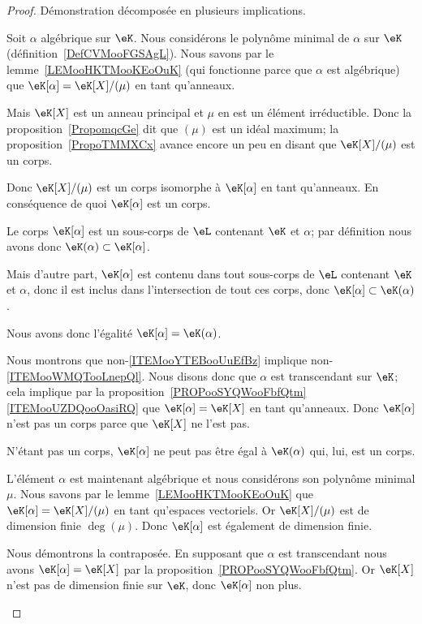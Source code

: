 \begin{proof}
	Démonstration décomposée en plusieurs implications.
	\begin{subproof}

		Soit \( \alpha\) algébrique sur \( \eK\). Nous considérons le polynôme minimal de \( \alpha\) sur \( \eK\) (définition~\ref{DefCVMooFGSAgL}). Nous savons par le lemme~\ref{LEMooHKTMooKEoOuK} (qui fonctionne parce que \( \alpha\) est algébrique) que \( \eK[\alpha]=\eK[X]/(\mu)\) en tant qu'anneaux.

		Mais \( \eK[X]\) est un anneau principal et \( \mu\) en est un élément irréductible. Donc la proposition~\ref{PropomqcGe} dit que \( (\mu)\) est un idéal maximum; la proposition~\ref{PropoTMMXCx} avance encore un peu en disant que \( \eK[X]/(\mu)\) est un corps.

		Donc \( \eK[X]/(\mu)\) est un corps isomorphe à \( \eK[\alpha]\) en tant qu'anneaux. En conséquence de quoi \( \eK[\alpha]\) est un corps.

		Le corps \( \eK[\alpha]\) est un sous-corps de \( \eL\) contenant \( \eK\) et \( \alpha\); par définition nous avons donc \( \eK(\alpha)\subset \eK[\alpha]\).

		Mais d'autre part, \( \eK[\alpha]\) est contenu dans tout sous-corps de \( \eL\) contenant \( \eK\) et \( \alpha\), donc il est inclus dans l'intersection de tout ces corps, donc \( \eK[\alpha]\subset \eK(\alpha)\).

		Nous avons donc l'égalité \( \eK[\alpha]=\eK(\alpha)\).


		Nous montrons que non-\ref{ITEMooYTEBooUuEfBz} implique non-\ref{ITEMooWMQTooLnepQl}. Nous disons donc que \( \alpha\) est transcendant sur \( \eK\); cela implique par la proposition~\ref{PROPooSYQWooFbfQtm}\ref{ITEMooUZDQooOasiRQ} que \( \eK[\alpha]=\eK[X]\) en tant qu'anneaux. Donc \( \eK[\alpha]\) n'est pas un corps parce que \( \eK[X]\) ne l'est pas.

		N'étant pas un corps, \( \eK[\alpha]\) ne peut pas être égal à \( \eK(\alpha)\) qui, lui, est un corps.


		L'élément \( \alpha\) est maintenant algébrique et nous considérons son polynôme minimal \( \mu\). Nous savons par le lemme~\ref{LEMooHKTMooKEoOuK} que \( \eK[\alpha]=\eK[X]/(\mu)\) en tant qu'espaces vectoriels. Or \( \eK[X]/(\mu)\) est de dimension finie \( \deg(\mu)\). Donc \( \eK[\alpha]\) est également de dimension finie.


		Nous démontrons la contraposée. En supposant que \( \alpha\) est transcendant nous avons \( \eK[\alpha]=\eK[X]\) par la proposition~\ref{PROPooSYQWooFbfQtm}. Or \( \eK[X]\) n'est pas de dimension finie sur \( \eK\), donc \( \eK[\alpha]\) non plus.

	\end{subproof}
\end{proof}


